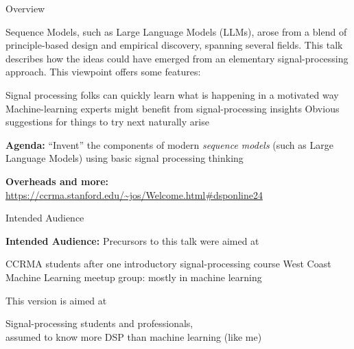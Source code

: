 \begin{slide}[\slideopts,method=direct,toc={}]{Overview}

Sequence Models, such as Large Language Models (LLMs), arose from a blend of principle-based design and empirical discovery, spanning several fields.
\maybepause
This talk describes how the ideas could have emerged from an elementary signal-processing approach.
\maybepause
This viewpoint offers some features:
\begin{enumerate}
\mpitem Signal processing folks can quickly learn what is happening in a motivated way
\mpitem Machine-learning experts might benefit from signal-processing insights
\mpitem Obvious suggestions for things to try next naturally arise
\end{enumerate}


\vspace{1em}
\maybepause
\textbf{Agenda:}
\maybepause
``Invent'' the components of modern \emph{sequence models} (such as Large Language Models) using basic signal processing thinking

\vspace{1em}
\maybepause
\textbf{Overheads and more:} \href{https://ccrma.stanford.edu/~jos/Welcome.html#dsponline24}{https://ccrma.stanford.edu/\~{}jos/Welcome.html\#dsponline24}

\end{slide}

\begin{slide}[\slideopts]{Intended Audience}

\maybepause
\textbf{Intended Audience:} Precursors to this talk were aimed at
\begin{enumerate}
\mpitem CCRMA students after one introductory signal-processing course
\mpitem West Coast Machine Learning meetup group: mostly in machine learning
\end{enumerate}
\maybepause
This version is aimed at
\begin{enumerate}
  \mpitem[3.] Signal-processing students and professionals,\\
              assumed to know more DSP than machine learning (like me)
\end{enumerate}

\end{slide}
